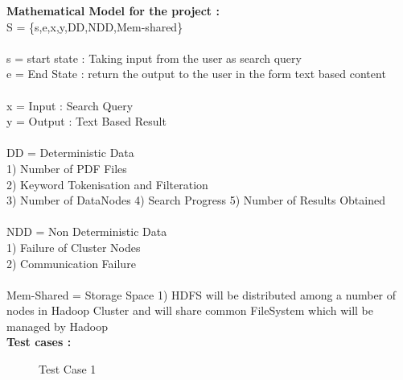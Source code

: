 \documentclass[oneside,a4paper,12pt]{report}
\begin{document}
{\begin{appendices}
\noindent \textbf{Mathematical Model for the project :} \\
S = \{s,e,x,y,DD,NDD,Mem-shared\} \\\\
s = start state : Taking input from the user as search query \\
e = End State : return the output to the user in the form text based content \\\\
x = Input : Search Query \\
y = Output : Text Based Result \\\\
DD = Deterministic Data \\
1) Number of PDF Files \\
2) Keyword Tokenisation and Filteration \\
3) Number of DataNodes 
4) Search Progress 
5) Number of Results Obtained \\\\
NDD = Non Deterministic Data \\
1) Failure of Cluster Nodes \\
2) Communication Failure  \\\\
Mem-Shared = Storage Space 
1) HDFS will be distributed among a number of nodes in Hadoop Cluster and will share common FileSystem which will be managed by Hadoop \\

\noindent \textbf{Test cases :}

\begin{center}
	\begin{figure}[H]
		\centering
	  \caption{Test Case 1}
	  \label{fig:state-dig}
	\end{figure}
\end{center} 


\end{appendices}}
\end{document}
